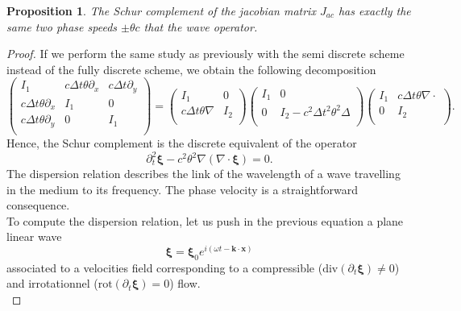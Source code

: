 \documentclass[a4paper, 11pt]{report}
\newtheorem{Proposition}{Proposition}
\begin{document}
\begin{Proposition}
The Schur complement of the jacobian matrix $J_{ac}$ has exactly the same two phase speeds $\pm \theta c$ that the wave operator.
\end{Proposition}
\begin{proof}
If we perform the same study as previously with the semi discrete scheme instead of the fully discrete scheme, we obtain the following decomposition
\begin{equation*}
\begin{pmatrix}
I_1 & c\Delta t\theta \partial_x &c\Delta t\partial_y\\
c\Delta t\theta \partial_x &I_1&0\\
c\Delta t\theta\partial_y & 0 &I_1\\
\end{pmatrix}=
\begin{pmatrix}
I_1 & 0\\
c\Delta t\theta \nabla &I_2\\
\end{pmatrix}
\begin{pmatrix}
I_1 & 0\\
 0 &I_2-c^2\Delta t^2\theta^2\Delta\\
\end{pmatrix}
\begin{pmatrix}
I_1 & c\Delta t\theta \nabla\cdot\\
0 &I_2\\
\end{pmatrix}.
\end{equation*}
Hence, the Schur complement is the discrete equivalent of the operator
\begin{equation*}
\partial_t^2\boldsymbol{\xi}-c^2\theta^2\nabla\left(\nabla\cdot\boldsymbol{\xi}\right)=0.
\end{equation*}
The dispersion relation describes the link of the wavelength of a wave travelling in the medium to its frequency. The phase velocity is a straightforward consequence.  \\
To compute the dispersion relation, let us push in the previous equation a plane linear wave
\begin{equation*}
\boldsymbol{\xi}=\boldsymbol{\xi}_0e^{i(\omega t-\boldsymbol{k}\cdot \boldsymbol{x})}
\end{equation*}
associated to a velocities field corresponding to a compressible ($\mathrm{div}(\partial_t\boldsymbol{\xi})\neq0$)
and irrotationnel ($\boldsymbol{\mathrm{rot}}(\partial_t\boldsymbol{\xi})=0$) flow.\\

\end{proof}
\end{document}
